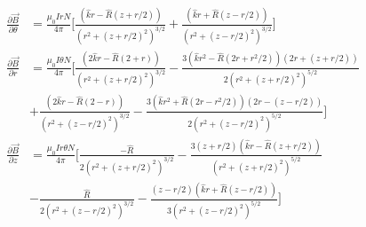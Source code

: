 \begin{align*}
    \frac{\partial \vec{B}}{\partial \theta} &= \frac{\mu_{0} Ir N}{4\pi}\Big[\frac{(\hat{k}r-\hat{R}(z+r/2))}{(r^2+(z+r/2)^2)^{3/2}}+\frac{(\hat{k}r+\hat{R}(z-r/2))}{(r^2+(z-r/2)^2)^{3/2}}\Big] \\
    \frac{\partial \vec{B}}{\partial r} &= \frac{\mu_{0} I\theta N}{4\pi}\Bigg[\frac{(2\hat{k}r-\hat{R}(2+r))}{(r^2+(z+r/2)^2)^{3/2}} -\frac{3(\hat{k}r^2 -\hat{R}(2r+r^2/2))(2r+(z+r/2))}{2(r^2+(z+r/2)^2)^{5/2}} \\
    & +\frac{(2\hat{k}r-\hat{R}(2-r))}{(r^2+(z-r/2)^2)^{3/2}}-\frac{3(\hat{k}r^2 +\hat{R}(2r-r^2/2))(2r-(z-r/2))}{2(r^2+(z-r/2)^2)^{5/2}}\Bigg] \\
    \frac{\partial \vec{B}}{\partial z} &= \frac{\mu_{0} Ir\theta N}{4\pi}\Big[\frac{-\hat{R}}{2(r^2+(z+r/2)^2)^{3/2}}-\frac{3(z+r/2)(\hat{k}r-\hat{R}(z+r/2))}{(r^2+(z+r/2)^2)^{5/2}} \\
    & -\frac{\hat{R}}{2(r^2+(z-r/2)^2)^{3/2}}-\frac{(z-r/2)(\hat{k}r+\hat{R}(z-r/2))}{3(r^2+(z-r/2)^2)^{5/2}}\Big] \\
\end{align*}
